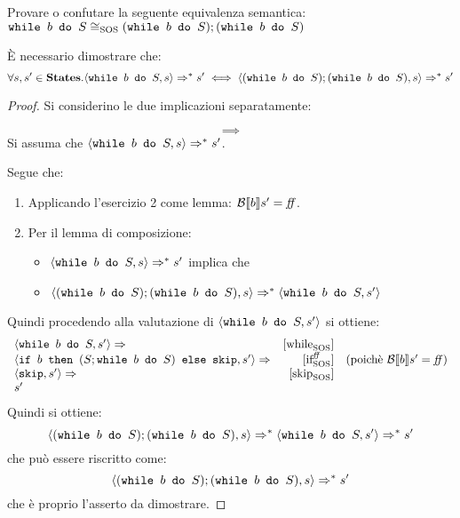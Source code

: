 {
  Provare o confutare la seguente equivalenza semantica: \vspace{.7em} \\
$\wbS{b}{S} \eqSOS (\wbS{b}{S}); (\wbS{b}{S})$
}
{




È necessario dimostrare che:
$$
\forall s,s' \in \states.
	\confSs{\wbS{b}{S}}{s} \Rar{*} s'
	\iff
	\confSs{(\wbS{b}{S}); (\wbS{b}{S})}{s} \Rar{*} s'
$$
\begin{proof} Si considerino le due implicazioni separatamente:

\vspace{10pt}
$$
\boxed{\implies}
$$
Si assuma che $\confSs{\wbS{b}{S}}{s} \Rar{*} s'$.

Segue che:
\begin{enumerate}
 \item Applicando l'esercizio 2 come lemma: $\B{b}' = \semfalse$. 
 \item Per il lemma di composizione: 
   \begin{itemize}
      \item $\confSs{\wbS{b}{S}}{s} \Rar{*} s'$ implica che
      \item $\confSs{(\wbS{b}{S}); (\wbS{b}{S})}{s} \Rar{*} \confSs{\wbS{b}{S}}{s'}$
   \end{itemize}
\end{enumerate}
Quindi procedendo alla valutazione di $\confSs{\wbS{b}{S}}{s'}$ si ottiene:
$$
\begin{array}{lrr}
\confSs{\wbS{b}{S}}{s'} \Rar{} & \whileSOS & \\
\confSs{\ifABC{b}{(S; \wbS{b}{S})}{\skipForFriends}}{s'} \Rar{} & \ifffSOS & 
(\text{poichè }\B{b}' = \semfalse)\\
\confSs{\skipForFriends}{s'} \Rar{} & \skipSOS\\
s' &\\
\end{array}
$$
Quindi si ottiene:
$$
\confSs{(\wbS{b}{S}); (\wbS{b}{S})}{s} \Rar{*} \confSs{\wbS{b}{S}}{s'} \Rar{*} s'
$$
che può essere riscritto come:
$$\confSs{(\wbS{b}{S}); (\wbS{b}{S})}{s} \Rar{*} s'$$
che è proprio l'asserto da dimostrare.
\vspace{10pt}



\end{proof}}
